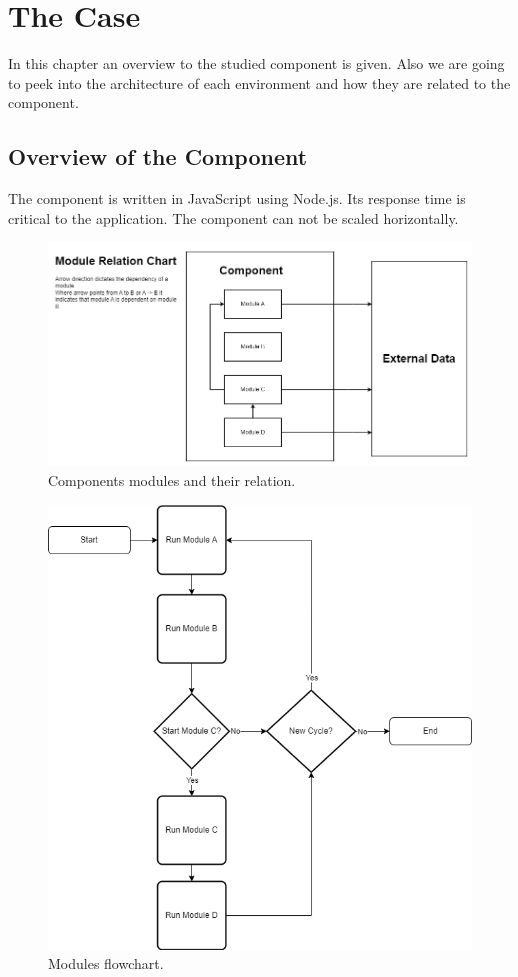 \chapter{The Case\label{case}}
In this chapter an overview to the studied component is given.
Also we are going to peek into the architecture of each environment and how they are related to the component.

\section{Overview of the Component}
The component is written in JavaScript using Node.js.
Its response time is critical to the application.
The component can not be scaled horizontally.

\begin{figure}
    \includegraphics[width=\textwidth]{images/modules_relation_uml.png}
    \caption{Components modules and their relation.}
    \label{figure:module:relation}
\end{figure}
\begin{figure}
    \includegraphics[width=\textwidth]{images/module_flow_chart.png}
    \caption{Modules flowchart.}
    \label{figure:module:flow}
\end{figure}

